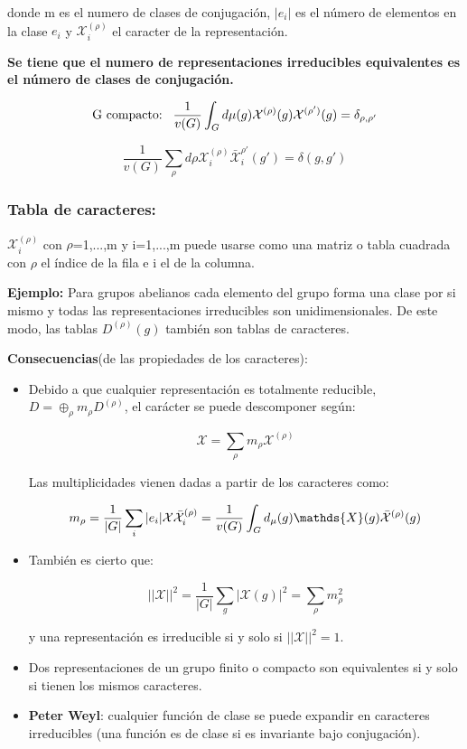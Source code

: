 \documentclass{article}
\begin{document}
         donde m es el numero de clases de conjugación, $|e_i|$ es el número de elementos en la clase $e_i$ y $\mathcal{X}_i^{(\rho)}$ el caracter de la representación.

         \textbf{Se tiene que el numero de representaciones irreducibles equivalentes es el número de clases de conjugación.}

          $$\text{G compacto:} \hspace{0.3cm} \frac{1}{v(G)}\int _G d\mu (g) \mathcal{X}^{(\rho)} (g)\mathcal{X}^{(\rho  ')}(g)=\delta _{\rho , \rho '}$$

         $$\frac{1}{v(G)}\sum _\rho d \rho \mathcal{X}_i^{(\rho)} \bar{\mathcal{X}}_i^{\rho'} (g') =\delta (g,g') $$


  \subsubsection{Tabla de caracteres:}

  \smallskip
  $\mathcal{X}_i^{(\rho)}$ con $\rho $=1,...,m y i=1,...,m puede usarse como una matriz o tabla cuadrada con $\rho$ el índice de la fila e i el de la columna.

  \smallskip

  \textbf{Ejemplo:} Para grupos abelianos cada elemento del grupo forma una clase por si mismo y todas las representaciones irreducibles son unidimensionales. De este modo, las tablas $D^{(\rho)}(g)$ también son tablas de caracteres.
\smallskip

    \textbf{Consecuencias}(de las propiedades de los caracteres):

    \begin{itemize}
        \item Debido a que cualquier representación es totalmente reducible, $D= \oplus _\rho m_\rho D^{(\rho)}$, el carácter se puede descomponer según:

        $$\mathcal{X}=\sum _{\rho} m_\rho \mathcal{X}^{(\rho)}$$

        Las multiplicidades vienen dadas a partir de los caracteres como:

        $$m_\rho =\frac{1}{|G|}\sum _i |e_i|\mathcal{X}\bar{\mathcal{X}}_i^{(\rho)}=\frac{1}{v(G)}\int _G d_\mu (g)\mathds{X}(g)\Bar{\mathcal{X}}^{(\rho)}(g)$$

        \item También es cierto que:

        $$||\mathcal{X}||^2=\frac{1}{|G|}\sum _g|\mathcal{X}(g)|^2=\sum _\rho m_\rho ^2$$

        y una representación es irreducible si y  solo si  $||\mathcal{X}||^2=1$.

        \item Dos representaciones de un grupo finito o compacto son equivalentes si y solo si tienen los mismos caracteres.

        \item \textbf{Peter Weyl}: cualquier función de clase se puede expandir en caracteres irreducibles (una función es de clase si es invariante bajo conjugación).

    \end{itemize}
\end{document}
